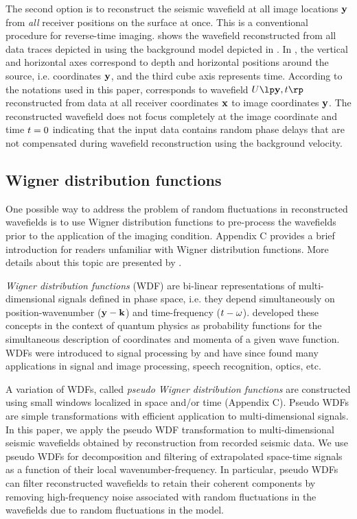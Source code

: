 The second option is to reconstruct the seismic wavefield at all image
locations ${\mathbf{y}}$ from {\it all} receiver positions on the surface at
once. This is a conventional procedure for reverse-time imaging.
 shows the wavefield reconstructed from all
data traces depicted in  using the background model
depicted in . In , the vertical and
horizontal axes correspond to depth and horizontal positions around
the source, i.e. coordinates ${\mathbf{y}}$, and the third cube axis represents
time. According to the notations used in this paper, 
corresponds to wavefield $\UU{\ym,\tm}$ reconstructed from data at all
receiver coordinates ${\mathbf{x}}$ to image coordinates ${\mathbf{y}}$.  The
reconstructed wavefield does not focus completely at the image
coordinate and time ${t}=0$ indicating that the input data contains
random phase delays that are not compensated during wavefield
reconstruction using the background velocity.


\subsection{Wigner distribution functions}
One possible way to address the problem of random fluctuations in
reconstructed wavefields is to use Wigner distribution functions
\cite[]{Wigner.wdf} to pre-process the wavefields prior to the 
application of the imaging condition. Appendix C provides a brief
introduction for readers unfamiliar with Wigner distribution
functions. More details about this topic are presented by
\cite{Cohen.timefrequencyanalysis}.

{\it Wigner distribution functions} (WDF) are bi-linear
representations of multi-dimensional signals defined in phase space,
i.e. they depend simultaneously on position-wavenumber (${\mathbf{y}}-{\mathbf{k}}$) and
time-frequency (${t}-{\omega}$). \cite{Wigner.wdf} developed these concepts
in the context of quantum physics as probability functions for the
simultaneous description of coordinates and momenta of a given wave
function. WDFs were introduced to signal processing by
\cite{Ville.wdf} and have since found many applications in signal and
image processing, speech recognition, optics, etc.

A variation of WDFs, called {\it pseudo Wigner distribution functions}
are constructed using small windows localized in space and/or time
(Appendix C). Pseudo WDFs are simple transformations with efficient
application to multi-dimensional signals. In this paper, we apply the
pseudo WDF transformation to multi-dimensional seismic wavefields
obtained by reconstruction from recorded seismic data. We use pseudo
WDFs for decomposition and filtering of extrapolated space-time
signals as a function of their local wavenumber-frequency. In
particular, pseudo WDFs can filter reconstructed wavefields to retain
their coherent components by removing high-frequency noise associated
with random fluctuations in the wavefields due to random fluctuations
in the model.

